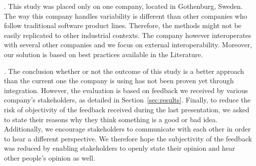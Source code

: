 . %
This study was placed only on one company, located in Gothenburg, Sweden. The way this company handles variability is different than other companies who follow traditional software product lines. Therefore, the methods might not be easily replicated to other industrial contexts. The company however interoperates with several other companies and we focus on external interoperability. Moreover, our solution is based on best practices available in the Literature. %

. %
The conclusion whether or not the outcome of this study is a better approach than the current one the company is using has not been proven yet through integration. However, the evaluation is based on feedback we received by various company's stakeholders, as detailed in Section~\ref{sec:results}. 
Finally, to reduce the risk of objectivity of the feedback received during the last presentation, we asked to state their reasons why they think something is a good or bad idea. Additionally, we encourage stakeholders to communicate with each other in order to hear a different perspective. %
We therefore hope the subjectivity of the feedback was reduced by enabling stakeholders to openly state their opinion and hear other people's opinion as well.



